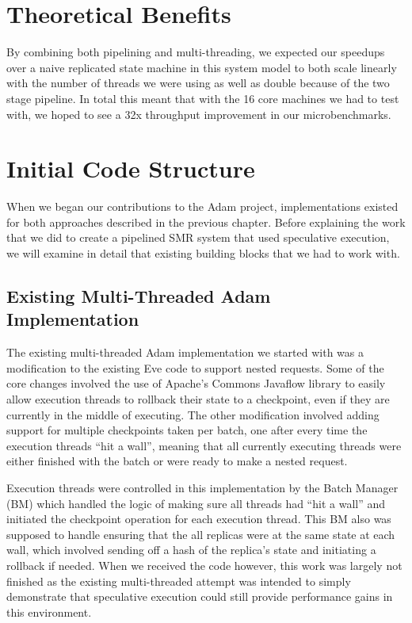 \documentclass[11pt, oneside]{report}
\begin{document}
\section{Theoretical Benefits}

By combining both pipelining and multi-threading, we expected our speedups over a naive replicated state machine in this system model to both scale linearly with the number of threads we were using as well as double because of the two stage pipeline. In total this meant that with the 16 core machines we had to test with, we hoped to see a 32x throughput improvement in our microbenchmarks.

\section{Initial Code Structure}

When we began our contributions to the Adam project, implementations existed for both approaches described in the previous chapter. Before explaining the work that we did to create a pipelined SMR system that used speculative execution, we will examine in detail that existing building blocks that we had to work with.

\subsection{Existing Multi-Threaded Adam Implementation}

The existing multi-threaded Adam implementation we started with was a modification to the existing Eve code to support nested requests. Some of the core changes involved the use of Apache's Commons Javaflow library to easily allow execution threads to rollback their state to a checkpoint, even if they are currently in the middle of executing. The other modification involved adding support for multiple checkpoints taken per batch, one after every time the execution threads ``hit a wall'', meaning that all currently executing threads were either finished with the batch or were ready to make a nested request.

Execution threads were controlled in this implementation by the Batch Manager (BM) which handled the logic of making sure all threads had ``hit a wall'' and initiated the checkpoint operation for each execution thread. This BM also was supposed to handle ensuring that the all replicas were at the same state at each wall, which involved sending off a hash of the replica's state and initiating a rollback if needed. When we received the code however, this work was largely not finished as the existing multi-threaded attempt was intended to simply demonstrate that speculative execution could still provide performance gains in this environment.
\end{document}
